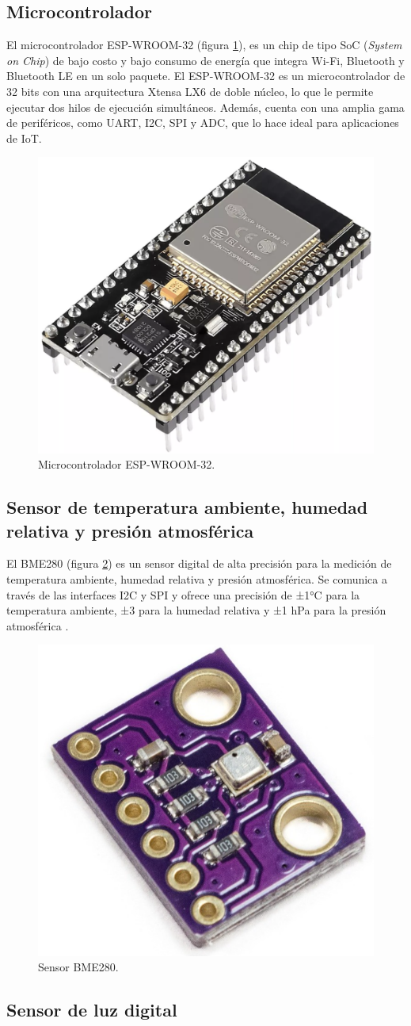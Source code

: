 \subsection{Microcontrolador}\label{sec:microcontrolador}

El microcontrolador ESP-WROOM-32 (figura \ref{fig:ESP32}), es un chip de tipo
SoC (\textit{System on Chip}) de bajo costo y bajo consumo de energía que
integra Wi-Fi, Bluetooth y Bluetooth LE en un solo paquete. El ESP-WROOM-32
\cite{EspressifESP32WROOM} es un microcontrolador de 32 bits con una
arquitectura Xtensa LX6 de doble núcleo, lo que le permite ejecutar dos hilos
de ejecución simultáneos. Además, cuenta con una amplia gama de periféricos,
como UART, I2C, SPI y ADC, que lo hace ideal para aplicaciones de IoT.

\begin{figure}[H]
	\centering
	\includegraphics[width=.25\textwidth]{./Images/3.png}
	\caption{Microcontrolador ESP-WROOM-32.}
	\label{fig:ESP32}
\end{figure}

\subsection{Sensor de temperatura ambiente, humedad relativa y presión atmosférica}

El BME280 (figura \ref{fig:BME280}) es un sensor digital de alta precisión para
la medición de temperatura ambiente, humedad relativa y presión atmosférica. Se
comunica a través de las interfaces I2C y SPI y ofrece una precisión de ±1°C
para la temperatura ambiente, ±3\code{\%} para la humedad relativa y ±1 hPa
para la presión atmosférica \cite{BoschBME280}.

\begin{figure}[H]
	\centering
	\includegraphics[width=.10\textwidth]{./Images/4.png}
	\caption{Sensor BME280.}
	\label{fig:BME280}
\end{figure}

\subsection{Sensor de luz digital}\label{sec:BH1750}

